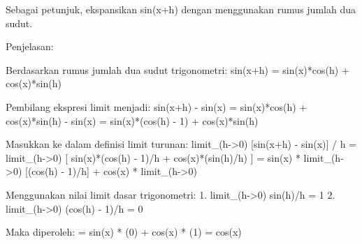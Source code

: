 \documentclass{article}
\newenvironment{eulernotebook}{\par}{\par}
\newenvironment{eulercomment}{\par\medskip}{\par\medskip}
\begin{document}
\begin{eulernotebook}
\begin{eulercomment}
\begin{eulercomment}
\begin{eulercomment}
\begin{eulercomment}
\begin{eulercomment}
Sebagai petunjuk, ekspansikan sin(x+h) dengan menggunakan rumus jumlah
dua sudut.

Penjelasan:\\
\end{eulercomment}
\begin{eulerttcomment}
 Berdasarkan rumus jumlah dua sudut trigonometri:
 sin(x+h) = sin(x)*cos(h) + cos(x)*sin(h)
\end{eulerttcomment}
\begin{eulercomment}

\end{eulercomment}
\begin{eulerttcomment}
 Pembilang ekspresi limit menjadi:
 sin(x+h) - sin(x) = sin(x)*cos(h) + cos(x)*sin(h) - sin(x)
                   = sin(x)*(cos(h) - 1) + cos(x)*sin(h)
\end{eulerttcomment}
\begin{eulercomment}

\end{eulercomment}
\begin{eulerttcomment}
 Masukkan ke dalam definisi limit turunan:
 limit_(h->0) [sin(x+h) - sin(x)] / h
   = limit_(h->0) [ sin(x)*(cos(h) - 1)/h + cos(x)*(sin(h)/h) ]
   = sin(x) * limit_(h->0) [(cos(h) - 1)/h] + cos(x) * limit_(h->0)
\end{eulerttcomment}
\begin{eulercomment}
[sin(h)/h]

\end{eulercomment}
\begin{eulerttcomment}
 Menggunakan nilai limit dasar trigonometri:
 1. limit_(h->0) sin(h)/h = 1
 2. limit_(h->0) (cos(h) - 1)/h = 0
\end{eulerttcomment}
\begin{eulercomment}

\end{eulercomment}
\begin{eulerttcomment}
 Maka diperoleh:
   = sin(x) * (0) + cos(x) * (1) = cos(x)
\end{eulerttcomment}
\begin{eulercomment}


\end{eulercomment}
\end{eulercomment}
\end{eulercomment}
\end{eulercomment}
\end{eulercomment}
\end{eulernotebook}
\end{document}

